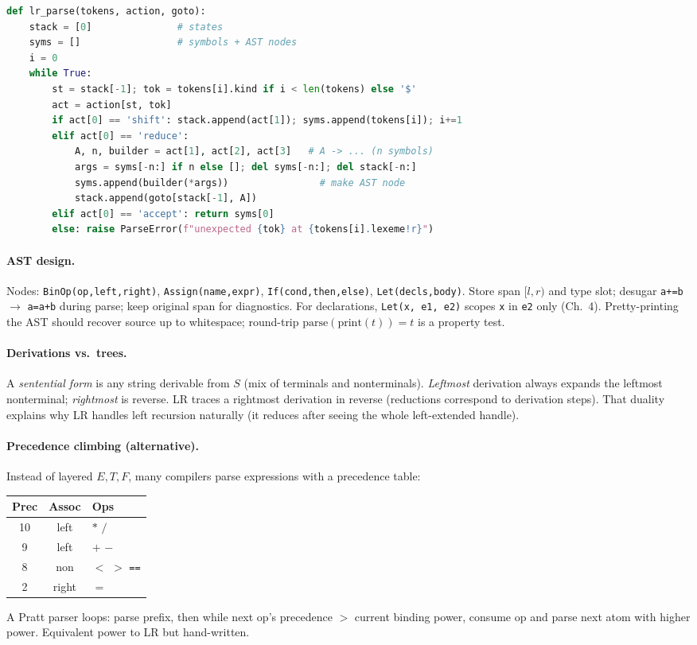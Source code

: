 \begin{lstlisting}[language=Python]
def lr_parse(tokens, action, goto):
    stack = [0]               # states
    syms = []                 # symbols + AST nodes
    i = 0
    while True:
        st = stack[-1]; tok = tokens[i].kind if i < len(tokens) else '$'
        act = action[st, tok]
        if act[0] == 'shift': stack.append(act[1]); syms.append(tokens[i]); i+=1
        elif act[0] == 'reduce':
            A, n, builder = act[1], act[2], act[3]   # A -> ... (n symbols)
            args = syms[-n:] if n else []; del syms[-n:]; del stack[-n:]
            syms.append(builder(*args))                # make AST node
            stack.append(goto[stack[-1], A])
        elif act[0] == 'accept': return syms[0]
        else: raise ParseError(f"unexpected {tok} at {tokens[i].lexeme!r}")
\end{lstlisting}

\paragraph{AST design.} Nodes: \texttt{BinOp(op,left,right)}, \texttt{Assign(name,expr)}, \texttt{If(cond,then,else)}, \texttt{Let(decls,body)}. Store span $[l,r)$ and type slot; desugar \texttt{a+=b} $\to$ \texttt{a=a+b} during parse; keep original span for diagnostics.
For declarations, \texttt{Let(x, e1, e2)} scopes \texttt{x} in \texttt{e2} only (Ch.~4). Pretty-printing the AST should recover source up to whitespace; round-trip $ \text{parse}(\text{print}(t))=t$ is a property test.

\paragraph{Derivations vs.\ trees.} A \emph{sentential form} is any string derivable from $S$ (mix of terminals and nonterminals). \emph{Leftmost} derivation always expands the leftmost nonterminal; \emph{rightmost} is reverse. LR traces a rightmost derivation in reverse (reductions correspond to derivation steps). That duality explains why LR handles left recursion naturally (it reduces after seeing the whole left-extended handle).

\paragraph{Precedence climbing (alternative).} Instead of layered $E,T,F$, many compilers parse expressions with a precedence table:
\begin{center}
\begin{tabular}{ccl}
Prec & Assoc & Ops\\ \midrule
10 & left & $*$ $/$\\
9 & left & $+$ $-$\\
8 & non  & $<$ $>$ \texttt{==}\\
2 & right & $=$\\
\end{tabular}
\end{center}
A Pratt parser loops: parse prefix, then while next op's precedence $>$ current binding power, consume op and parse next atom with higher power. Equivalent power to LR but hand-written.

